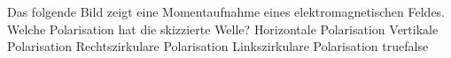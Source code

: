     {Das folgende Bild zeigt eine Momentaufnahme eines elektromagnetischen Feldes. Welche Polarisation hat die skizzierte Welle?}
    {Horizontale Polarisation}
    {Vertikale Polarisation}
    {Rechtszirkulare Polarisation}
    {Linkszirkulare Polarisation}
    {true}{false}